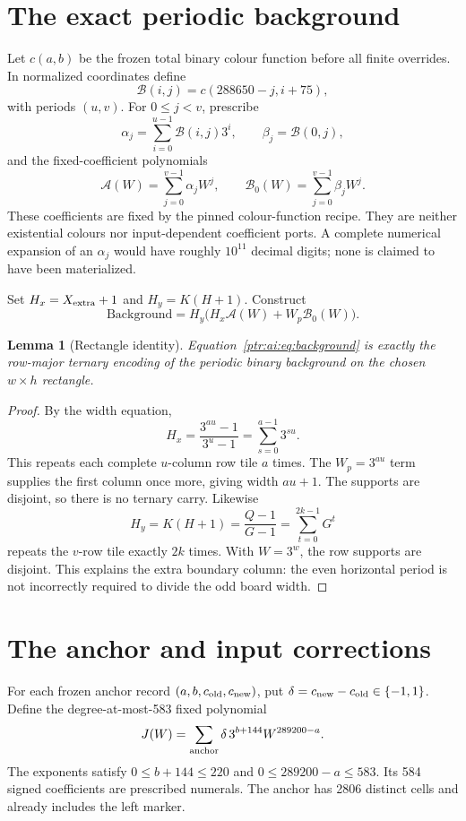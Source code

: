 \documentclass[11pt,letterpaper]{article}
\newtheorem{lemma}[theorem]{Lemma}
\theoremstyle{definition}\newtheorem{definition}[theorem]{Definition}
\theoremstyle{remark}\newtheorem{remark}[theorem]{Remark}
\begin{document}
\section{The exact periodic background}\label{ptr:ai:sec:background}
Let $c(a,b)$ be the frozen total binary colour function before all finite overrides. In normalized coordinates define
\[
 \mathcal B(i,j)=c(288650-j,i+75),
\]
with periods $(u,v)$. For $0\le j<v$, prescribe
\[
 \alpha_j=\sum_{i=0}^{u-1}\mathcal B(i,j)3^i,
 \qquad \beta_j=\mathcal B(0,j),
\]
and the fixed-coefficient polynomials
\begin{equation}\label{ptr:ai:eq:tilepolys}
 \mathcal A(W)=\sum_{j=0}^{v-1}\alpha_jW^j,
 \qquad \mathcal B_0(W)=\sum_{j=0}^{v-1}\beta_jW^j.
\end{equation}
These coefficients are fixed by the pinned colour-function recipe. They are neither existential colours nor input-dependent coefficient ports. A complete numerical expansion of an $\alpha_j$ would have roughly $10^{11}$ decimal digits; none is claimed to have been materialized.

Set $H_x=X_{\rm extra}+1$ and $H_y=K(H+1)$. Construct
\begin{equation}\label{ptr:ai:eq:background}
 \mathrm{Background}=H_y\bigl(H_x\mathcal A(W)+W_p\mathcal B_0(W)\bigr).
\end{equation}
\begin{lemma}[Rectangle identity]\label{ptr:ai:lem:background}
Equation~\eqref{ptr:ai:eq:background} is exactly the row-major ternary encoding of the periodic binary background on the chosen $w\times h$ rectangle.
\end{lemma}
\begin{proof}
By the width equation,
\[
 H_x=\frac{3^{au}-1}{3^u-1}=\sum_{s=0}^{a-1}3^{su}.
\]
This repeats each complete $u$-column row tile $a$ times. The $W_p=3^{au}$ term supplies the first column once more, giving width $au+1$. The supports are disjoint, so there is no ternary carry. Likewise
\[
 H_y=K(H+1)=\frac{Q-1}{G-1}=\sum_{t=0}^{2k-1}G^t
\]
repeats the $v$-row tile exactly $2k$ times. With $W=3^w$, the row supports are disjoint. This explains the extra boundary column: the even horizontal period is not incorrectly required to divide the odd board width.
\end{proof}

\section{The anchor and input corrections}\label{ptr:ai:sec:patch}
For each frozen anchor record $(a,b,c_{\rm old},c_{\rm new})$, put $\delta=c_{\rm new}-c_{\rm old}\in\{-1,1\}$. Define the degree-at-most-583 fixed polynomial
\begin{equation}\label{ptr:ai:eq:J}
 J(W)=\sum_{\rm anchor}\delta\,3^{b+144}W^{289200-a}.
\end{equation}
The exponents satisfy $0\le b+144\le220$ and $0\le289200-a\le583$. Its 584 signed coefficients are prescribed numerals. The anchor has 2806 distinct cells and already includes the left marker.
\end{document}
